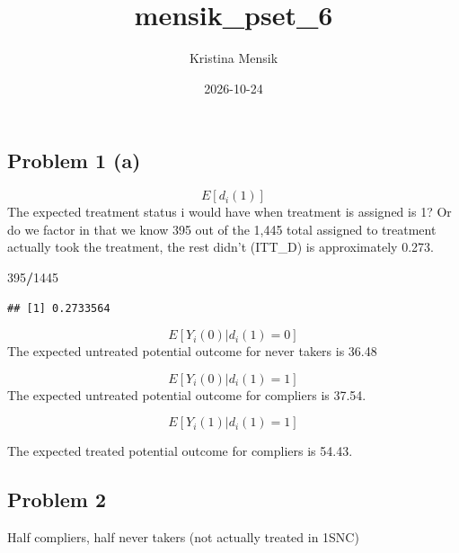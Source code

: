 \documentclass[
]{article}
\title{mensik\_pset\_6}
\author{Kristina Mensik}
\date{2026-10-24}
\newenvironment{Shaded}{\begin{snugshade}}{\end{snugshade}}
\newcommand{\DecValTok}[1]{\textcolor[rgb]{0.00,0.00,0.81}{#1}}
\newcommand{\SpecialCharTok}[1]{\textcolor[rgb]{0.81,0.36,0.00}{\textbf{#1}}}
\begin{document}
\maketitle

\subsection{Problem 1 (a)}\label{problem-1-a}

\[
E[d_i(1)]
\] The expected treatment status i would have when treatment is assigned
is 1? Or do we factor in that we know 395 out of the 1,445 total
assigned to treatment actually took the treatment, the rest didn't
(ITT\_D) is approximately 0.273.

\begin{Shaded}
\begin{Highlighting}[]
\DecValTok{395}\SpecialCharTok{/}\DecValTok{1445}
\end{Highlighting}
\end{Shaded}

\begin{verbatim}
## [1] 0.2733564
\end{verbatim}

\[
E[Y_i(0)|d_i(1) = 0]
\] The expected untreated potential outcome for never takers is 36.48

\[
E[Y_i(0)|d_i(1) = 1]
\] The expected untreated potential outcome for compliers is 37.54.

\[
E[Y_i(1)|d_i(1) = 1]
\]

The expected treated potential outcome for compliers is 54.43.

\subsection{Problem 2}\label{problem-2}

Half compliers, half never takers (not actually treated in 1SNC)
\end{document}

